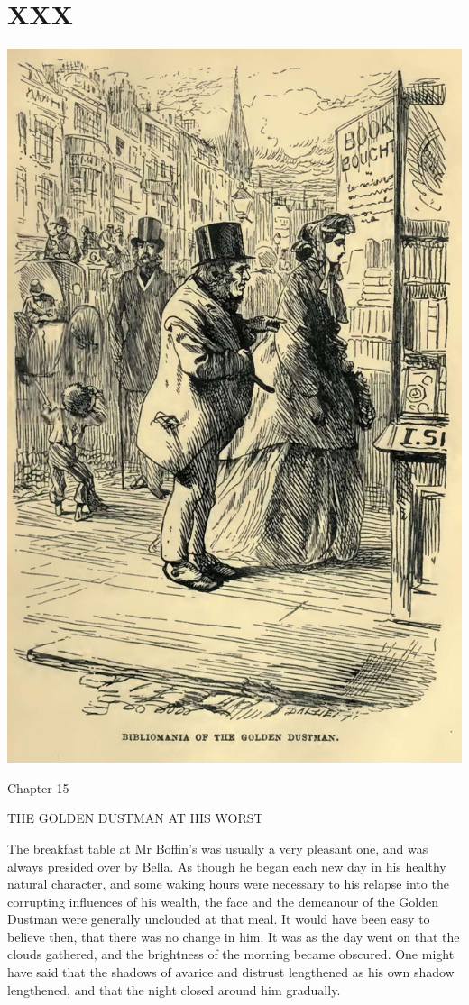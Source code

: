 
\chapter{XXX}

\includegraphics[scale=2.3]{03-05-01}

Chapter 15

THE GOLDEN DUSTMAN AT HIS WORST


The breakfast table at Mr Boffin’s was usually a very pleasant one, and
was always presided over by Bella. As though he began each new day in
his healthy natural character, and some waking hours were necessary to
his relapse into the corrupting influences of his wealth, the face and
the demeanour of the Golden Dustman were generally unclouded at that
meal. It would have been easy to believe then, that there was no change
in him. It was as the day went on that the clouds gathered, and the
brightness of the morning became obscured. One might have said that the
shadows of avarice and distrust lengthened as his own shadow lengthened,
and that the night closed around him gradually.

